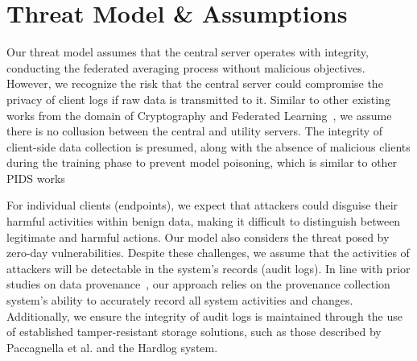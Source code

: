 
\section{Threat Model \& Assumptions}

Our threat model assumes that the central server operates with integrity, conducting the federated averaging process without malicious objectives.  However, we recognize the risk that the central server could compromise the privacy of client logs if raw data is transmitted to it. Similar to other existing works from the domain of Cryptography and Federated Learning~\cite{roy2020crypte,wu2022federated},  we assume there is no collusion between the central and utility servers. The integrity of client-side data collection is presumed, along with the absence of malicious clients during the training phase to prevent model poisoning, which is similar to other PIDS works~\cite{cheng2023kairos,flash2024,yangprographer,wang2022threatrace,provdetector2020}

For individual clients (endpoints), we expect that attackers could disguise their harmful activities within benign data, making it difficult to distinguish between legitimate and harmful actions. Our model also considers the threat posed by zero-day vulnerabilities. Despite these challenges, we assume that the activities of attackers will be detectable in the system's records (audit logs). In line with prior studies on data provenance~\cite{nodoze2019, priotracker2018, mzx2016, bates2017transparent,omegalog,rapsheet2020,provthings2018,dossier,inam2023sok,poirot2019}, our approach relies on the provenance collection system's ability to accurately record all system activities and changes. Additionally, we ensure the integrity of audit logs is maintained through the use of established tamper-resistant storage solutions, such as those described by Paccagnella et al.\cite{paccagnella2020custos} and the Hardlog system\cite{hardlog}.


